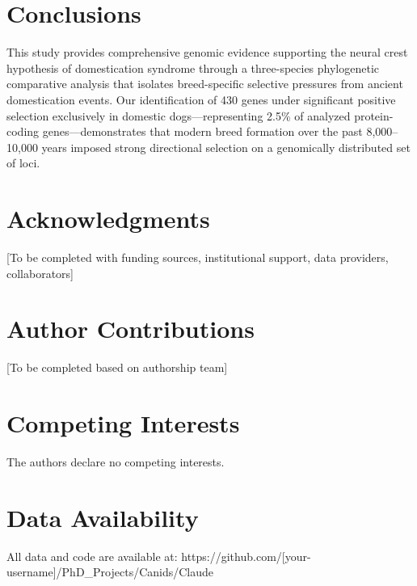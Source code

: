 \documentclass[11pt,letterpaper]{article}
\begin{document}

\section{Conclusions}


This study provides comprehensive genomic evidence supporting the neural crest hypothesis of domestication syndrome through a three-species phylogenetic comparative analysis that isolates breed-specific selective pressures from ancient domestication events. Our identification of 430 genes under significant positive selection exclusively in domestic dogs---representing 2.5\% of analyzed protein-coding genes---demonstrates that modern breed formation over the past 8,000--10,000 years imposed strong directional selection on a genomically distributed set of loci.


\section*{Acknowledgments}

[To be completed with funding sources, institutional support, data providers, collaborators]

\section*{Author Contributions}

[To be completed based on authorship team]

\section*{Competing Interests}

The authors declare no competing interests.

\section*{Data Availability}

All data and code are available at: https://github.com/[your-username]/PhD\_Projects/Canids/Claude

\end{document}
